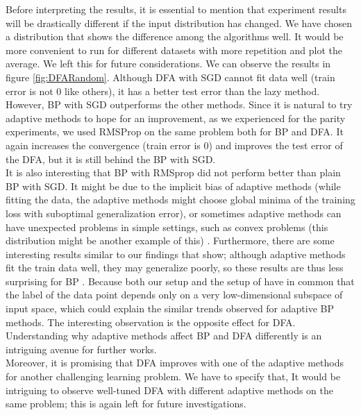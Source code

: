 \documentclass[a4paper, nobind]{templates/ociamthesis}
\begin{document}
\noindent Before interpreting the results, it is essential to mention that experiment results will be drastically different if the input distribution has changed. We have chosen a distribution that shows the difference among the algorithms well. It would be more convenient to run for different datasets with more repetition and plot the average. We left this for future considerations.
\noindent We can observe the results in figure \ref{fig:DFARandom}. Although DFA with SGD cannot fit data well (train error is not \(0\) like others), it has a better test error than the lazy method. However, BP with SGD outperforms the other methods. Since it is natural to try adaptive methods to hope for an improvement, as we experienced for the parity experiments, we used RMSProp on the same problem both for BP and DFA. It again increases the convergence (train error is \(0\)) and improves the test error of the DFA, but it is still behind the BP with SGD.\\
\noindent It is also interesting that BP with RMSprop did not perform better than plain BP with SGD. It might be due to the implicit bias of adaptive methods (while fitting the data, the adaptive methods might choose global minima of the training loss with suboptimal generalization error), or sometimes adaptive methods can have unexpected problems in simple settings, such as convex problems (this distribution might be another example of this) \cite{reddi2019convergence}. Furthermore, there are some interesting results similar to our findings that show; although adaptive methods fit the train data well, they may generalize poorly, so these results are thus less surprising for BP \cite{wilson2018marginal}. Because both our setup and the setup of \cite{wilson2018marginal} have in common that the label of the data point depends only on a very low-dimensional subspace of input space, which could explain the similar trends observed for adaptive BP methods. The interesting observation is the opposite effect for DFA. Understanding why adaptive methods affect BP and DFA differently is an intriguing avenue for further works.\\
\noindent Moreover, it is promising that DFA improves with one of the adaptive methods for another challenging learning problem. We have to specify that, It would be intriguing to observe well-tuned DFA with different adaptive methods on the same problem; this is again left for future investigations.\\
\end{document}
